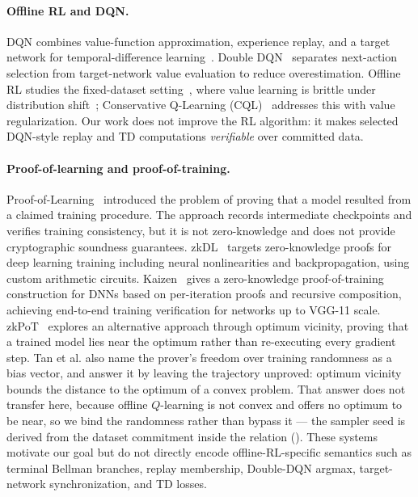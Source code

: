 
\paragraph{Offline RL and DQN.}
DQN combines value-function approximation, experience replay, and a target
network for temporal-difference learning~\cite{mnih2015dqn,
watkins1992qlearning}. Double DQN~\cite{hasselt2016double} separates
next-action selection from target-network value evaluation to reduce
overestimation. Offline RL studies the fixed-dataset
setting~\cite{levine2020offline}, where value learning is brittle under
distribution shift~\cite{fujimoto2019offpolicy}; Conservative Q-Learning
(CQL)~\cite{kumar2020cql} addresses this with value regularization. Our work
does not improve the RL algorithm: it makes selected DQN-style replay and TD
computations \emph{verifiable} over committed data.

\paragraph{Proof-of-learning and proof-of-training.}
Proof-of-Learning~\cite{jia2021proofoflearning} introduced the problem of
proving that a model resulted from a claimed training procedure. The approach
records intermediate checkpoints and verifies training consistency, but it is
not zero-knowledge and does not provide cryptographic soundness guarantees.
zkDL~\cite{zkdl2023} targets zero-knowledge proofs for deep learning training
including neural nonlinearities and backpropagation, using custom arithmetic
circuits. Kaizen~\cite{kaizen2024} gives a zero-knowledge proof-of-training
construction for DNNs based on per-iteration proofs and recursive composition,
achieving end-to-end training verification for networks up to VGG-11 scale.
zkPoT~\cite{zkpotvicinity2025} explores an alternative approach through optimum vicinity, proving that a
trained model lies near the optimum rather than re-executing every gradient
step. Tan et al. also name the prover's freedom over training randomness as a
bias vector, and answer it by leaving the trajectory unproved: optimum vicinity
bounds the distance to the optimum of a convex problem. That answer does not
transfer here, because offline $Q$-learning is not convex and offers no optimum
to be near, so we bind the randomness rather than bypass it --- the sampler seed
is derived from the dataset commitment inside the relation
(). These systems motivate our goal but do not
directly encode offline-RL-specific semantics such as terminal Bellman branches, replay membership, Double-DQN
argmax, target-network synchronization, and TD losses.


